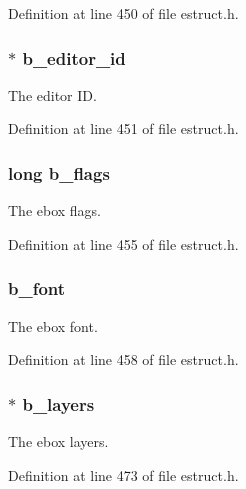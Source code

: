 Definition at line 450 of file estruct.\-h.

\hypertarget{struct__ebox_adf8c80c6ea45ad810c754984d98830ff}{
\subsubsection[{b\-\_\-editor\-\_\-id}]{$\ast$ b\-\_\-editor\-\_\-id}}\label{struct__ebox_adf8c80c6ea45ad810c754984d98830ff}
The editor I\-D. 

Definition at line 451 of file estruct.\-h.

\hypertarget{struct__ebox_abdae234dbd983dfbfb0592858c4ff026}{
\subsubsection[{b\-\_\-flags}]{\setlength{\rightskip}{0pt plus 5cm}long b\-\_\-flags}}\label{struct__ebox_abdae234dbd983dfbfb0592858c4ff026}
The ebox flags. 

Definition at line 455 of file estruct.\-h.

\hypertarget{struct__ebox_a4071412a20456f5fcafe2a91cdef11c3}{
\subsubsection[{b\-\_\-font}]{ b\-\_\-font}}\label{struct__ebox_a4071412a20456f5fcafe2a91cdef11c3}
The ebox font. 

Definition at line 458 of file estruct.\-h.

\hypertarget{struct__ebox_ad80949f483467d74761a9e321300d64e}{
\subsubsection[{b\-\_\-layers}]{$\ast$ b\-\_\-layers}}\label{struct__ebox_ad80949f483467d74761a9e321300d64e}
The ebox layers. 

Definition at line 473 of file estruct.\-h.

